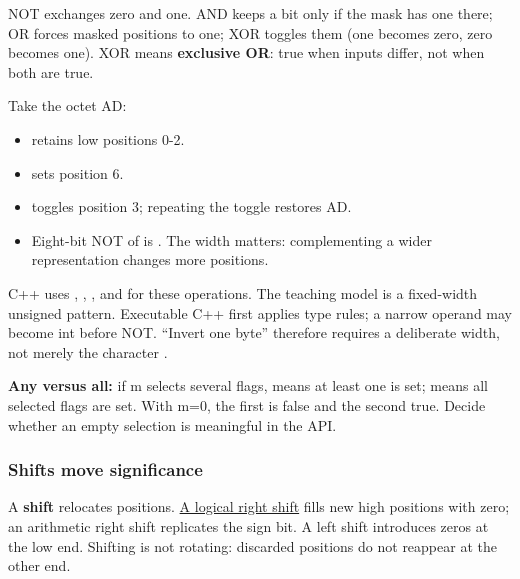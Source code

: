 NOT exchanges zero and one. AND keeps a bit only if the mask has one there; OR forces masked positions to one; XOR toggles them (one becomes zero, zero becomes one). XOR means \textbf{exclusive OR}: true when inputs differ, not when both are true.

Take the octet AD:

\begin{itemize}
\tightlist
\item
   retains low positions 0-2.
\item
   sets position 6.
\item
   toggles position 3; repeating the toggle restores AD.
\item
  Eight-bit NOT of  is . The width matters: complementing a wider representation changes more positions.
\end{itemize}

C++ uses \BookInlineCode{{\&}}{\&}, \BookInlineCode{{\textbar{}}}{\textbar{}}, \BookInlineCode{{\^{}}}{\^{}}, and \BookInlineCode{{\textasciitilde{}}}{\textasciitilde{}} for these operations. The teaching model is a fixed-width unsigned pattern. Executable C++ first applies type rules; a narrow operand may become int before NOT. ``Invert one byte'' therefore requires a deliberate width, not merely the character \BookInlineCode{{\textasciitilde{}}}{\textasciitilde{}}.

\textbf{Any versus all:} if m selects several flags,  means at least one is set;  means all selected flags are set. With m=0, the first is false and the second true. Decide whether an empty selection is meaningful in the API.

\subsubsection{Shifts move significance}\label{01-foundations-i-ch001-shifts-move-significance}

\hypertarget{01-foundations-i-ch001-shifts-move-significance}{}

A \textbf{shift} relocates positions. \hyperref[appendix-73425b25118e]{A logical right shift} fills new high positions with zero; an arithmetic right shift replicates the sign bit. A left shift introduces zeros at the low end. Shifting is not rotating: discarded positions do not reappear at the other end.

